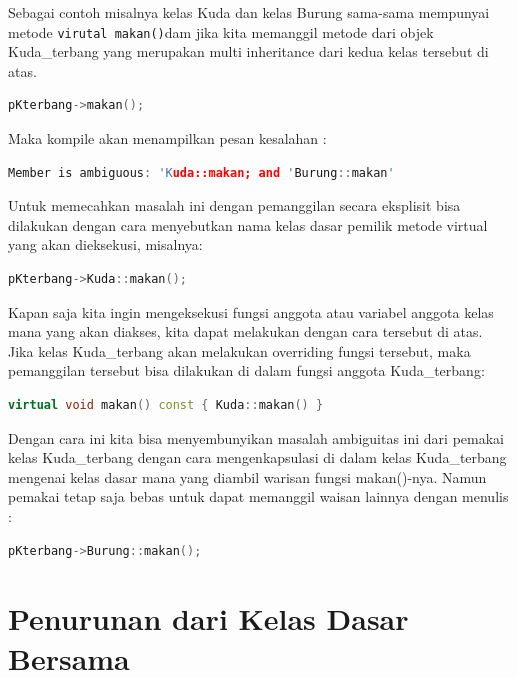 Sebagai contoh misalnya kelas Kuda dan kelas Burung sama-sama mempunyai
metode \texttt{virutal\ makan()}dam jika kita memanggil metode dari
objek Kuda\_terbang yang merupakan multi inheritance dari kedua kelas
tersebut di atas.

\begin{lstlisting}[language=c++, numbers=none]
pKterbang->makan();
\end{lstlisting}

Maka kompile akan menampilkan pesan kesalahan :

\begin{lstlisting}[language=c++, numbers=none]
Member is ambiguous: 'Kuda::makan; and 'Burung::makan'
\end{lstlisting}

Untuk memecahkan masalah ini dengan pemanggilan secara eksplisit bisa
dilakukan dengan cara menyebutkan nama kelas dasar pemilik metode
virtual yang akan dieksekusi, misalnya:

\begin{lstlisting}[language=c++, numbers=none]
pKterbang->Kuda::makan();
\end{lstlisting}

Kapan saja kita ingin mengeksekusi fungsi anggota atau variabel anggota
kelas mana yang akan diakses, kita dapat melakukan dengan cara tersebut
di atas. Jika kelas Kuda\_terbang akan melakukan overriding fungsi
tersebut, maka pemanggilan tersebut bisa dilakukan di dalam fungsi
anggota Kuda\_terbang:

\begin{lstlisting}[language=c++, numbers=none]
virtual void makan() const { Kuda::makan() }
\end{lstlisting}

Dengan cara ini kita bisa menyembunyikan masalah ambiguitas ini dari
pemakai kelas Kuda\_terbang dengan cara mengenkapsulasi di dalam kelas
Kuda\_terbang mengenai kelas dasar mana yang diambil warisan fungsi
makan()-nya. Namun pemakai tetap saja bebas untuk dapat memanggil waisan
lainnya dengan menulis :

\begin{lstlisting}[language=c++, numbers=none]
pKterbang->Burung::makan();
\end{lstlisting}

\section{Penurunan dari Kelas Dasar
Bersama}\label{penurunan-dari-kelas-dasar-bersama}

